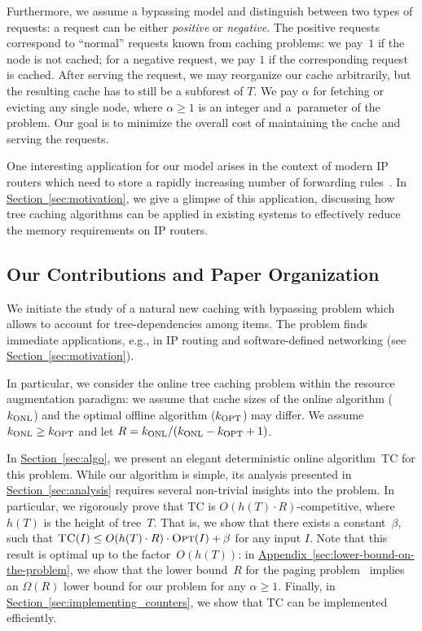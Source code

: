\documentclass[sigconf,screen=true]{acmart}
\newcommand{\lref}[2][]{\hyperref[#2]{#1~\ref*{#2}}}
\newcommand{\ALG}{\textsc{TC}\xspace}
\newcommand{\OPT}{\textsc{Opt}\xspace}
\newcommand{\kALG}{k_\textnormal{ONL}}
\newcommand{\kOPT}{k_\textnormal{OPT}}
\begin{document}
Furthermore, we assume a bypassing model and distinguish between two types of
requests: a request can be either \emph{positive} or \emph{negative}. The
positive requests correspond to ``normal'' requests known from caching
problems: we pay~$1$ if the node is not cached; for a negative request, we pay
$1$ if the corresponding request is cached. After serving the request, we may
reorganize our cache arbitrarily, but the resulting cache has to still be a
subforest of $T$. We pay $\alpha$ for fetching or evicting any single node,
where $\alpha \geq 1$ is an integer and a~parameter of the problem. Our goal
is to minimize the overall cost of maintaining the cache and serving the
requests.

One interesting application for our model arises in the context of modern IP
routers which need to store a rapidly increasing number of forwarding
rules~\cite{bgp-routeviews,steve-myth}. In \lref[Section]{sec:motivation}, we
give a glimpse of this application, discussing how tree caching algorithms can
be applied in existing systems to effectively reduce the memory requirements
on IP routers.


\subsection{Our Contributions and Paper Organization}

We initiate the study of a natural new caching with bypassing problem which
allows to account for tree-dependencies among items. The problem finds
immediate applications, e.g., in IP routing and software-defined networking
(see \lref[Section]{sec:motivation}).

In particular, we consider the online tree caching problem within the resource
augmentation paradigm: we assume that cache sizes of the online algorithm
($\kALG$)  and the optimal offline algorithm ($\kOPT$) may differ. We assume
$\kALG \geq \kOPT$ and let $R = \kALG/(\kALG-\kOPT+1)$.

In \lref[Section]{sec:algo}, we present an elegant deterministic online
algorithm~\ALG for this problem. While our algorithm is simple, its analysis
presented in \lref[Section]{sec:analysis} requires several non-trivial
insights into the problem. In particular, we rigorously prove that \ALG is
$O(h(T) \cdot R)$-competitive, where $h(T)$ is the height of tree~$T$. That
is, we show that there exists a constant~$\beta$, such that $\ALG(I) \leq
O(h(T) \cdot R) \cdot \OPT(I) + \beta$ for any input $I$. Note that this
result is optimal up to the factor~$O(h(T))$: in
\lref[Appendix]{sec:lower-bound-on-the-problem}, we show that the lower
bound~$R$ for the paging problem~\cite{competitive-analysis} implies an
$\Omega(R)$ lower bound for our problem for any $\alpha \geq 1$. Finally, in
\lref[Section]{sec:implementing_counters}, we show that \ALG can be
implemented efficiently.
\end{document}
